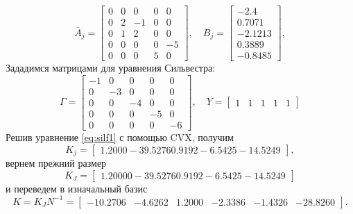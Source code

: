 \begin{equation*}
    \bar A_j=\begin{bmatrix}
       0 & 0 & 0 & 0 & 0 \\
       0  & 2 & -1 & 0 & 0 \\
       0  & 1 & 2 & 0 & 0 \\
       0  & 0 & 0 & 0 & -5 \\
       0 & 0 & 0 & 5 & 0
       \end{bmatrix},\quad
       B_j=\begin{bmatrix}
       -2.4 \\
       0.7071 \\
       -2.1213 \\
       0.3889 \\
       -0.8485
       \end{bmatrix},
\end{equation*}
Зададимся матрицами для уравнения Сильвестра:
\begin{equation*}
    \Gamma=\begin{bmatrix}
        -1 & 0 & 0 & 0 & 0 \\
         0 & -3 & 0 & 0 & 0 \\
         0 &  0 & -4 & 0 & 0 \\
         0 &  0 &  0 & -5 & 0 \\
         0 &  0 &  0 &  0 & -6
    \end{bmatrix},\quad
    Y=\begin{bmatrix}
        1 & 1 & 1 & 1 & 1
    \end{bmatrix}
\end{equation*}
Решив уравнение \eqref{eq:silf1} с помощью CVX, получим
\begin{equation*}
    K_j=\begin{bmatrix}
        1.2000	-39.5276	0.9192	-6.5425	-14.5249
    \end{bmatrix},
\end{equation*}
вернем прежний размер
\begin{equation*}
    K_J=\begin{bmatrix}
        1.2000	0 -39.5276	0.9192	-6.5425	-14.5249
    \end{bmatrix}
\end{equation*}
и переведем в изначальный базис
\begin{equation*}
    K=K_JN^{-1}=\begin{bmatrix}
        -10.2706	&-4.6262&	1.2000&	-2.3386&	-1.4326&	-28.8260
    \end{bmatrix}.
\end{equation*}

